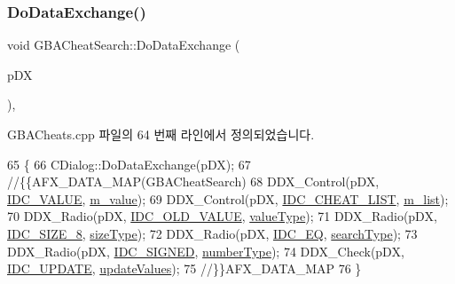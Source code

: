 \subsubsection{\texorpdfstring{Do\+Data\+Exchange()}{DoDataExchange()}}
{\footnotesize\ttfamily void G\+B\+A\+Cheat\+Search\+::\+Do\+Data\+Exchange (\begin{DoxyParamCaption}\item[{C\+Data\+Exchange $\ast$}]{p\+DX }\end{DoxyParamCaption})\hspace{0.3cm}{\ttfamily [protected]}, {\ttfamily [virtual]}}



G\+B\+A\+Cheats.\+cpp 파일의 64 번째 라인에서 정의되었습니다.


\begin{DoxyCode}
65 \{
66   CDialog::DoDataExchange(pDX);
67   \textcolor{comment}{//\{\{AFX\_DATA\_MAP(GBACheatSearch)}
68   DDX\_Control(pDX, \mbox{\hyperlink{resource_8h_aa862eefddc803e8e65c3253b8029314f}{IDC\_VALUE}}, \mbox{\hyperlink{class_g_b_a_cheat_search_aaff3a33037e3561aadfdfe905c66148f}{m\_value}});
69   DDX\_Control(pDX, \mbox{\hyperlink{resource_8h_a9e21f8b69374571cc4aa6ab5a8ce0b9b}{IDC\_CHEAT\_LIST}}, \mbox{\hyperlink{class_g_b_a_cheat_search_aab4be5c0e3c3436c738a43f466be0902}{m\_list}});
70   DDX\_Radio(pDX, \mbox{\hyperlink{resource_8h_a82e2e020fb1d5c999e3ffdd35e74dec7}{IDC\_OLD\_VALUE}}, \mbox{\hyperlink{class_g_b_a_cheat_search_a633f5b523a814d3f1e4cb06b1799b798}{valueType}});
71   DDX\_Radio(pDX, \mbox{\hyperlink{resource_8h_aabec7e8ec4648288db9ff8c10fdf3bb7}{IDC\_SIZE\_8}}, \mbox{\hyperlink{class_g_b_a_cheat_search_a9fc543b94f045d8c778cf921c06cc2c3}{sizeType}});
72   DDX\_Radio(pDX, \mbox{\hyperlink{resource_8h_a9ae6b6a030401ea977f3047c9080ba6c}{IDC\_EQ}}, \mbox{\hyperlink{class_g_b_a_cheat_search_a708b5bbf00916b2ff173eb07273b1db5}{searchType}});
73   DDX\_Radio(pDX, \mbox{\hyperlink{resource_8h_ae13e01a62e7c40be0e3a93d98d2cd1d3}{IDC\_SIGNED}}, \mbox{\hyperlink{class_g_b_a_cheat_search_a5f4137be5a232d58a5cf4e03c72b008c}{numberType}});
74   DDX\_Check(pDX, \mbox{\hyperlink{resource_8h_a2a7a453cb162c04233ad8c656a8fd6a9}{IDC\_UPDATE}}, \mbox{\hyperlink{class_g_b_a_cheat_search_a1b8eec1d7b81c1e297b71c4de071550f}{updateValues}});
75   \textcolor{comment}{//\}\}AFX\_DATA\_MAP}
76 \}
\end{DoxyCode}
\mbox{\label{class_g_b_a_cheat_search_ae1797b0166163a717a3f3dfa873c13e6}} 

